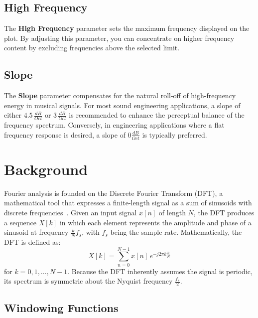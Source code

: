 \documentclass[12pt,letter]{article}
\begin{document}
\subsection{High Frequency}

The \textbf{High Frequency} parameter sets the maximum frequency displayed on
the plot. By adjusting this parameter, you can concentrate on higher
frequency content by excluding frequencies above the selected limit.

\subsection{Slope}

The \textbf{Slope} parameter compensates for the natural roll-off of
high-frequency energy in musical signals. For most sound engineering
applications, a slope of either $4.5\,\frac{dB}{Oct}$ or $3\,\frac{dB}{Oct}$
is recommended to enhance the perceptual balance of the frequency spectrum.
Conversely, in engineering applications where a flat frequency response is
desired, a slope of $0\frac{dB}{Oct}$ is typically preferred.


\clearpage
\section{Background}

Fourier analysis is founded on the Discrete Fourier Transform (DFT), a
mathematical tool that expresses a finite-length signal as a sum of sinusoids
with discrete frequencies~\citep{oppenheim1999discrete}. Given an input
signal $x[n]$ of length $N$, the DFT produces a sequence $X[k]$ in which each
element represents the amplitude and phase of a sinusoid at frequency
$\frac{k}{N} f_s$, with $f_s$ being the sample rate. Mathematically, the DFT
is defined as:
\begin{equation}
X[k] = \sum_{n=0}^{N-1} x[n] \, e^{-j2\pi k \frac{n}{N}}
\label{eqn:dft}
\end{equation}
for $k = 0, 1, \dots, N-1$. Because the DFT inherently assumes the signal is
periodic, its spectrum is symmetric about the Nyquist frequency
$\frac{f_s}{2}$.

\subsection{Windowing Functions}
\end{document}
